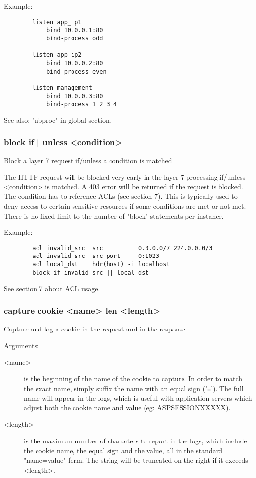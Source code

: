   Example:
  \begin{verbatim}
        listen app_ip1
            bind 10.0.0.1:80
            bind-process odd

        listen app_ip2
            bind 10.0.0.2:80
            bind-process even

        listen management
            bind 10.0.0.3:80
            bind-process 1 2 3 4
  \end{verbatim}

  See also: "nbproc" in global section.

\subsubsection[block]{block { if | unless } <condition>}
  Block a layer 7 request if/unless a condition is matched


  The HTTP request will be blocked very early in the layer 7 processing
  if/unless <condition> is matched. A 403 error will be returned if the request
  is blocked. The condition has to reference ACLs (see section 7). This is
  typically used to deny access to certain sensitive resources if some
  conditions are met or not met. There is no fixed limit to the number of
  "block" statements per instance.

  Example:
  \begin{verbatim}
        acl invalid_src  src          0.0.0.0/7 224.0.0.0/3
        acl invalid_src  src_port     0:1023
        acl local_dst    hdr(host) -i localhost
        block if invalid_src || local_dst
  \end{verbatim}

  See section 7 about ACL usage.

\subsubsection[capture cookie]{capture cookie <name> len <length>}
  Capture and log a cookie in the request and in the response.

                                  
  Arguments:
  \begin{description} 
  \item[<name>]    is the beginning of the name of the cookie to capture. In order
              to match the exact name, simply suffix the name with an equal
              sign ('\verb|=|'). The full name will appear in the logs, which is
              useful with application servers which adjust both the cookie name
              and value (eg: ASPSESSIONXXXXX).

  \item[<length>]  is the maximum number of characters to report in the logs, which
              include the cookie name, the equal sign and the value, all in the
              standard "name=value" form. The string will be truncated on the
              right if it exceeds <length>.
  \end{description}

